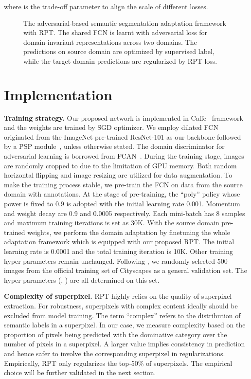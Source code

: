 \documentclass[10pt,twocolumn,letterpaper]{article}
\begin{document}
where  is the trade-off parameter to align the scale of different losses.
\begin{figure}[!tb]
   \vspace{-0.05in}
   \caption{\small The adversarial-based semantic segmentation adaptation framework with RPT. The shared FCN is learnt with adversarial loss for domain-invariant representations across two domains. The predictions on source domain are optimized by supervised label, while the target domain predictions are regularized by RPT loss.}
   \label{fig:framework}
   \vspace{-0.15in}
\end{figure}

\section{Implementation} \label{sec:imp}
\textbf{Training strategy.} Our proposed network is implemented in Caffe~\cite{jia2014caffe} framework and the weights are trained by SGD optimizer. We employ dilated FCN~\cite{chen2016deeplab} originated from the ImageNet pre-trained ResNet-101 as our backbone followed by a PSP module~\cite{zhao2017pspnet}, unless otherwise stated. The domain discriminator for adversarial learning is borrowed from FCAN~\cite{Zhang_2018_CVPR}. During the training stage, images are randomly cropped to  due to the limitation of GPU memory. Both random horizontal flipping and image resizing are utilized for data augmentation. To make the training process stable, we pre-train the FCN on data from the source domain with annotations. At the stage of pre-training, the ``poly'' policy whose power is fixed to 0.9 is adopted with the initial learning rate 0.001. Momentum and weight decay are 0.9 and 0.0005 respectively. Each mini-batch has 8 samples and maximum training iterations is set as 30K. With the source domain pre-trained weights, we perform the domain adaptation by finetuning the whole adaptation framework which is equipped with our proposed RPT. The initial learning rate is 0.0001 and the total training iteration is 10K. Other training hyper-parameters remain unchanged.
Following \cite{lian2019constructing}, we randomly selected 500 images from the official training set of Cityscapes as a general validation set. The hyper-parameters (, ) are all determined on this set.

\textbf{Complexity of superpixel.}
RPT highly relies on the quality of superpixel extraction. For robustness, superpixels with complex content ideally should be excluded from model training. The term ``complex'' refers to the distribution of semantic labels in a superpixel. In our case, we measure complexity based on the proportion of pixels being predicted with the dominative category over the number of pixels in a superpixel. A larger value implies consistency in prediction and hence safer to involve the corresponding superpixel in regularizations. Empirically, RPT only regularizes the top-50\% of superpixels. The empirical choice will be further validated in the next section.
\end{document}
